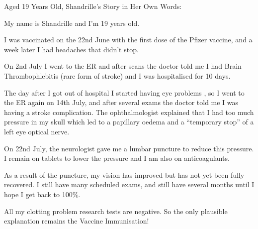 Aged 19 Years Old, Shandrille’s Story in Her Own Words:

My name is Shandrille and I’m 19 years old.

I was vaccinated on the 22nd June with the first dose of the Pfizer vaccine, and
a week later I had headaches that didn’t stop.

On 2nd July I went to the ER and after scans the doctor told me I had Brain
Thrombophlebitis (rare form of stroke) and I was hospitalised for 10 days.

The day after I got out of hospital I started having eye problems , so I went to
the ER again on 14th July, and after several exams the doctor told me I was
having a stroke complication. The ophthalmologist explained that I had too much
pressure in my skull which led to a papillary oedema and a ``temporary stop'' of
a left eye optical nerve.

On 22nd July, the neurologist gave me a lumbar puncture to reduce this
pressure. I remain on tablets to lower the pressure and I am also on
anticoagulants.

As a result of the puncture, my vision has improved but has not yet been fully
recovered. I still have many scheduled exams, and still have several months
until I hope I get back to 100\%.

All my clotting problem research tests are negative. So the only plausible
explanation remains the Vaccine Immunisation!

